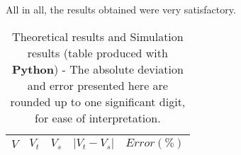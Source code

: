 All in all, the results obtained were very satisfactory.

\begin{table}[H]
  \centering
  \begin{tabular}{|c|c|c|c|c|}
    \hline
        $V$ & $V_t$ & $V_s$ & $|V_t-V_s|$ & $Error (\%)$ \\
        \hline
        \hline
        
        \hline
  \end{tabular}
  \caption{Theoretical results and Simulation results (table produced with {\bf Python}) - The absolute deviation and error presented here are rounded up to one significant digit, for ease of interpretation.}
  \label{error_res}
\end{table}
